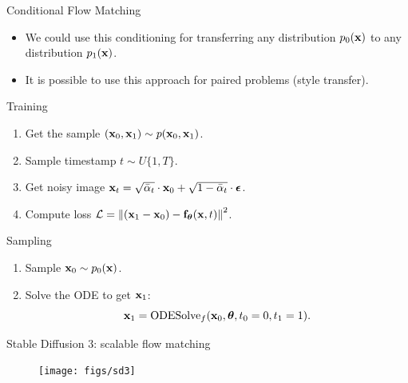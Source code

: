 \begin{frame}{Conditional Flow Matching}
	\begin{itemize}
		\item We could use this conditioning for transferring any distribution $p_0(\mathbf{x})$ to any distribution $p_1(\mathbf{x})$.
		\item It is possible to use this approach for paired problems (style transfer).
	\end{itemize}
	\begin{block}{Training}
		\begin{enumerate}
			\item Get the sample $(\mathbf{x}_0, \mathbf{x}_1) \sim p(\mathbf{x}_0, \mathbf{x}_1)$.
			\item Sample timestamp $t \sim U\{1, T\}$.
			\item Get noisy image $\mathbf{x}_t = \sqrt{\bar{\alpha}_t} \cdot \mathbf{x}_0 + \sqrt{1 - \bar{\alpha}_t} \cdot \boldsymbol{\epsilon}$.
			\item Compute loss $ \mathcal{L} = \left\| (\mathbf{x}_1 - \mathbf{x}_0) - \mathbf{f}_{\boldsymbol{\theta}}(\mathbf{x}, t) \right\|^2 $.
		\end{enumerate}
	\end{block}
	\vspace{-0.3cm}
	\begin{block}{Sampling}
		\begin{enumerate}
			\item Sample $\mathbf{x}_0 \sim p_0(\mathbf{x})$.
			\item Solve the ODE to get $\mathbf{x}_1$:
			\[
				\mathbf{x}_1 = \text{ODESolve}_f(\mathbf{x}_0, \boldsymbol{\theta}, t_0=0, t_1=1).
			\]
		\end{enumerate}
	\end{block}
\end{frame}
\begin{frame}{Stable Diffusion 3: scalable flow matching}
	\begin{figure}
		\centering
		\texttt{[image: figs/sd3]}
	\end{figure}
\end{frame}
